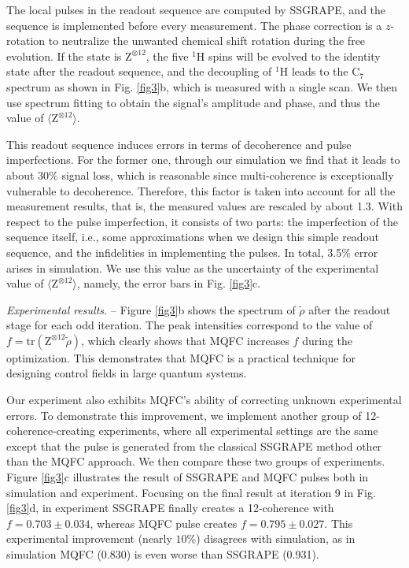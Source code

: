 \documentclass[twocolumn,reprint, amsmath,amssymb,showpacs,superscriptaddress]{revtex4-1}
\newcommand{\tr}{\textrm{tr}}
\begin{document}
 The local pulses in the readout sequence are computed by SSGRAPE, and the sequence is implemented before every measurement. The phase correction is a $z$-rotation to neutralize the unwanted chemical shift rotation during the free evolution. If the state is $\text{Z}^{\otimes 12}$, the five $^1$H spins will be evolved to the identity state after the readout sequence, and the decoupling of $^1$H  leads to the C$_7$ spectrum as shown in Fig. \ref{fig3}b, which is measured with a single scan. We then use spectrum fitting to obtain the signal's amplitude and phase, and thus the value of $\langle \text{Z}^{\otimes 12} \rangle$.

This readout sequence induces errors in terms of decoherence and pulse imperfections. For the former one, through our simulation we find that it leads to about $30\%$ signal loss, which is reasonable since multi-coherence is exceptionally vulnerable to decoherence. Therefore, this factor is taken into account for all the measurement results, that is, the measured values are rescaled by about 1.3. With respect to the pulse imperfection, it consists of two parts: the imperfection of the sequence itself, i.e., some approximations when we design this simple readout sequence, and the infidelities in implementing the pulses. In total, 3.5\% error arises in simulation. We use this value as the uncertainty of the experimental value of $\langle \text{Z}^{\otimes 12} \rangle$, namely, the error bars in Fig. \ref{fig3}c.

\emph{Experimental results.} -- Figure \ref{fig3}b shows the spectrum of $\tilde{\rho}$ after the readout stage for each odd iteration. The peak intensities correspond to the value of $f = \tr(\text{Z}^{\otimes 12}\tilde{\rho})$, which clearly shows that MQFC increases $f$ during the optimization. This demonstrates that MQFC is a practical technique for designing control fields in large quantum systems.

Our experiment also exhibits MQFC's ability of correcting unknown experimental errors. To demonstrate this improvement, we implement another group of 12-coherence-creating experiments, where all experimental settings are the same except that the pulse is generated from the classical SSGRAPE method other than the MQFC approach. We then compare these two groups of experiments. Figure \ref{fig3}c illustrates the result of SSGRAPE and MQFC pulses both in simulation and experiment. Focusing on the final result at iteration 9 in Fig. \ref{fig3}d, in experiment SSGRAPE finally creates a 12-coherence with $f=0.703\pm 0.034$, whereas MQFC pulse creates $f=0.795 \pm 0.027$. This experimental improvement (nearly $10\%$) disagrees with simulation, as in simulation MQFC (0.830) is even worse than SSGRAPE (0.931).
\end{document}

